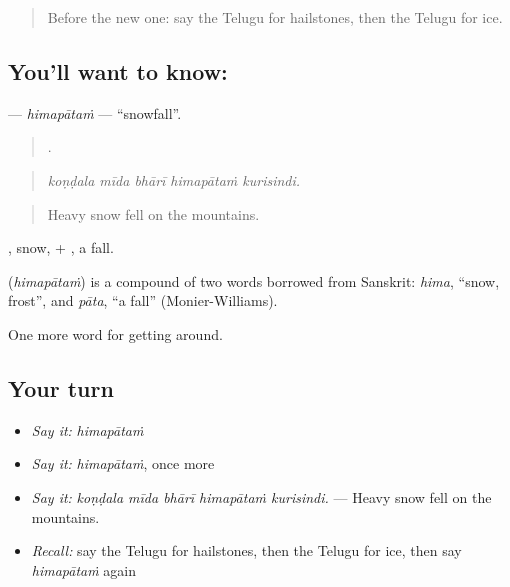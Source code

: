 \label{lesson:TE-C482-himapatam}



\begin{quote}
Before the new one: say the Telugu for hailstones, then the Telugu for ice.
\end{quote}

\subsection*{You'll want to know: }
\textbf{} — \emph{himapātaṁ} — \textquotedblleft{}snowfall\textquotedblright{}.

\begin{quote}
    .
\end{quote}

\begin{quote}
\emph{koṇḍala mīda bhārī himapātaṁ kurisindi.}
\end{quote}

\begin{quote}
Heavy snow fell on the mountains.
\end{quote}

, snow, + , a fall.

\begin{cousinweb}
\textbf{} (\emph{himapātaṁ}) is a compound of two words borrowed from Sanskrit: \emph{hima}, \textquotedblleft{}snow, frost\textquotedblright{}, and \emph{pāta}, \textquotedblleft{}a fall\textquotedblright{} (Monier-Williams).
\end{cousinweb}

\begin{grammarlens}[title={What you've built}]
One more word for getting around.
\end{grammarlens}

\subsection*{Your turn}
\begin{itemize}
\raggedright
  \item \emph{Say it:} \emph{himapātaṁ}
  \item \emph{Say it:} \emph{himapātaṁ}, once more
  \item \emph{Say it:} \emph{koṇḍala mīda bhārī himapātaṁ kurisindi.} — Heavy snow fell on the mountains.
  \item \emph{Recall:} say the Telugu for hailstones, then the Telugu for ice, then say \emph{himapātaṁ} again
\end{itemize}

